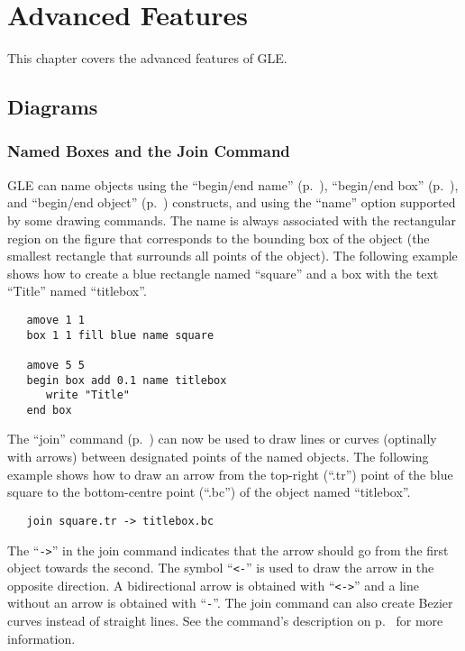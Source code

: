 \chapter{Advanced Features}
\label{adv:chap}

This chapter covers the advanced features of GLE. 
	
\section{Diagrams}

\subsection{Named Boxes and the Join Command}
\label{join:sec}

GLE can name objects using the ``begin/end name'' (p.~\pageref{cmd:beginname}), ``begin/end box'' (p.~\pageref{cmd:beginbox}), and ``begin/end object'' (p.~\pageref{cmd:beginobject}) constructs, and using the ``name'' option supported by some drawing commands. The name is always associated with the rectangular region on the figure that corresponds to the bounding box of the object (the smallest rectangle that surrounds all points of the object). The following example shows how to create a blue rectangle named ``square'' and a box with the text ``Title'' named ``titlebox''.

\begin{verbatim}
   amove 1 1
   box 1 1 fill blue name square
   
   amove 5 5 
   begin box add 0.1 name titlebox
      write "Title"
   end box
\end{verbatim}	 

The ``join'' command (p.~\pageref{cmd:join}) can now be used to draw lines or curves (optinally with arrows) between designated points of the named objects. The following example shows how to draw an arrow from the top-right (``.tr'') point of the blue square to the bottom-centre point (``.bc'') of the object named ``titlebox''.

\begin{verbatim}	 
   join square.tr -> titlebox.bc
\end{verbatim}

The ``\verb+->+'' in the join command indicates that the arrow should go from the first object towards the second. The symbol ``\verb+<-+'' is used to draw the arrow in the opposite direction. A bidirectional arrow is obtained with ``\verb+<->+'' and a line without an arrow is obtained with ``\verb+-+''. The join command can also create Bezier curves instead of straight lines. See the command's description on p.~\pageref{cmd:join} for more information.

